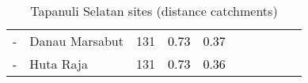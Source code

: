 \begin{table}[ht]
\begin{tabular}{C{0.05\textwidth}C{0.15\textwidth}C{0.08\textwidth}C{0.08\textwidth}C{0.08\textwidth}C{0.08\textwidth}C{0.08\textwidth}C{0.08\textwidth}C{0.08\textwidth}C{0.08\textwidth}}
  {-} & Danau Marsabut & 131 & \textcolor[HTML]{000000}{0.73} & \textcolor[HTML]{000000}{0.37} & \textcolor[HTML]{FFFFFF}{4} &  &  &  &  \\ 
  {-} & Huta Raja & 131 & \textcolor[HTML]{000000}{0.73} & \textcolor[HTML]{000000}{0.36} & \textcolor[HTML]{FFFFFF}{4} &  &  &  &  \\ 
  \end{tabular}
\endgroup
\caption{Tapanuli Selatan sites (distance catchments)} 
\end{table}

